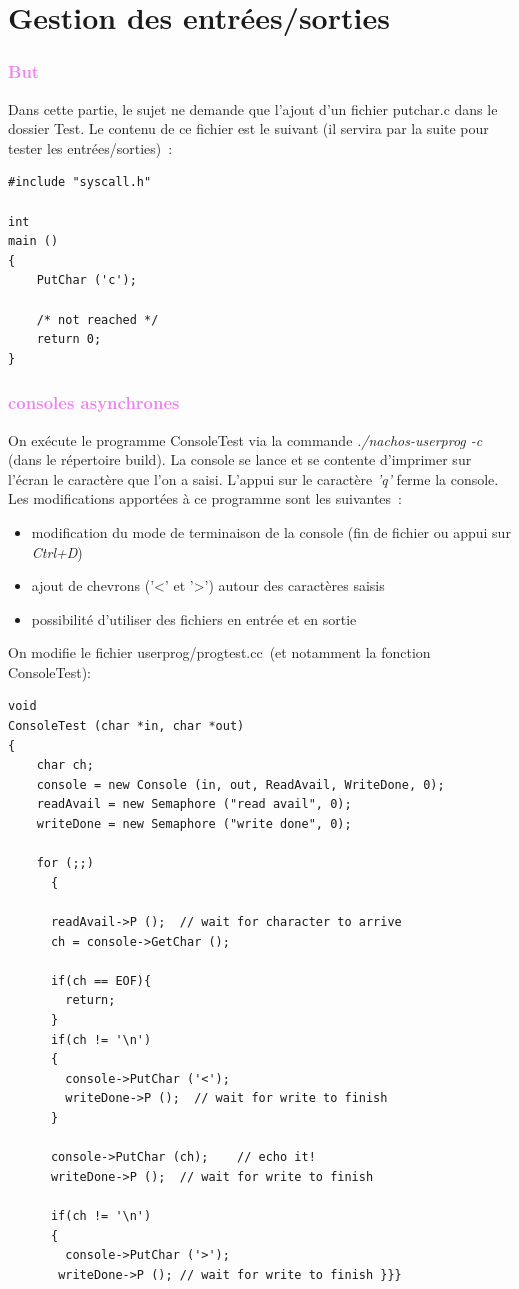 \documentclass[a4paper,10pt]{report}
\begin{document}
  \part{Gestion des entrées/sorties}
  \textcolor{Violet}{\section{But}}
  Dans cette partie, le sujet ne demande que l'ajout d'un fichier putchar.c dans le dossier Test. 
  Le contenu de ce fichier est le suivant (il servira par la suite pour tester les entrées/sorties) :
  \begin{lstlisting}
#include "syscall.h"

int
main ()
{
    PutChar ('c');

    /* not reached */
    return 0;
}   
  \end{lstlisting}
 \textcolor{Violet}{\section{consoles asynchrones}}
 On exécute le programme ConsoleTest via la commande \emph{./nachos-userprog -c} (dans le répertoire build). 
 La console se lance et se contente d'imprimer sur l'écran le caractère que l'on a saisi. L'appui sur le caractère \emph{'q'} ferme la console.
 Les modifications apportées à ce programme sont les suivantes :
 \begin{itemize}
  \item modification du mode de terminaison de la console (fin de fichier ou appui sur \emph{Ctrl+D})
  \item ajout de chevrons ('<' et '>') autour des caractères saisis
  \item possibilité d'utiliser des fichiers en entrée et en sortie
 \end{itemize}
On modifie le fichier userprog/progtest.cc (et notamment la fonction ConsoleTest):
\begin{lstlisting}
void
ConsoleTest (char *in, char *out)
{
    char ch;
    console = new Console (in, out, ReadAvail, WriteDone, 0);
    readAvail = new Semaphore ("read avail", 0);
    writeDone = new Semaphore ("write done", 0);

    for (;;)
      {

	  readAvail->P ();	// wait for character to arrive
	  ch = console->GetChar ();

      if(ch == EOF){
        return;
      }
      if(ch != '\n')
      {
        console->PutChar ('<');
        writeDone->P ();  // wait for write to finish
      }

	  console->PutChar (ch);	// echo it!
      writeDone->P ();  // wait for write to finish

      if(ch != '\n')
      {
        console->PutChar ('>');
	   writeDone->P ();	// wait for write to finish }}}
\end{lstlisting}
\end{document}

